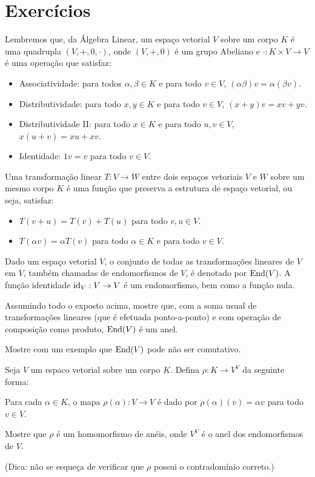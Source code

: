 \section{Exercícios}
\begin{exer}
Lembremos que, da Álgebra Linear, um espaço vetorial $V$ sobre um corpo $K$ é uma quadrupla $(V, +, 0, \cdot)$, onde $(V, +, 0)$ é um grupo Abeliano e $\cdot:K\times V\rightarrow V$ é uma operação que satisfaz:

\begin{itemize}
    \item Associatividade: para todos $\alpha, \beta \in K$ e para todo $v \in V$, $(\alpha\beta)v=\alpha(\beta v)$.
    \item Distributividade: para todo $x, y \in K$ e para todo $v \in V$, $(x+y)v=xv+yv$.
    \item Distributividade II: para todo $x \in K$ e para todo $u, v \in V$, $x(u+v)=xu+xv$.
    \item Identidade: $1v=v$ para todo $v \in V$.
\end{itemize}

Uma transformação linear $T:V\rightarrow W$ entre dois espaços vetoriais $V$ e $W$ sobre um mesmo corpo $K$ é uma função que preserva a estrutura de espaço vetorial, ou seja, satisfaz:

\begin{itemize}
    \item $T(v+u)=T(v)+T(u)$ para todo $v, u \in V$.
    \item $T(\alpha v)=\alpha T(v)$ para todo $\alpha \in K$ e para todo $v \in V$.
\end{itemize}

Dado um espaço vetorial $V$, o conjunto de todas as transformações lineares de $V$ em $V$, também chamadas de endomorfismos de $V$, é denotado por $\operatorname{End}(V)$.
A função identidade $\operatorname{id}_V:V\rightarrow V$ é um endomorfismo, bem como a função nula.

Assumindo todo o exposto acima, mostre que, com a soma usual de transformações lineares (que é efetuada ponto-a-ponto) e com operação de composição como produto, $\operatorname{End}(V)$ é um anel.

Mostre com um exemplo que $\operatorname{End}(V)$ pode não ser comutativo.
\end{exer}

\begin{exer}
Seja $V$ um espaco vetorial sobre um corpo $K$.
Defina $\rho:K\rightarrow V^V$ da seguinte forma: 

Para cada $\alpha \in K$, o mapa $\rho(\alpha):V\rightarrow V$ é dado por $\rho(\alpha)(v)=\alpha v$ para todo $v \in V$.

Mostre que $\rho$ é um homomorfismo de anéis, onde $V^V$ é o anel dos endomorfismos de $V$.

(Dica: não se esqueça de verificar que $\rho$ possui o contradomínio correto.)
\end{exer}
